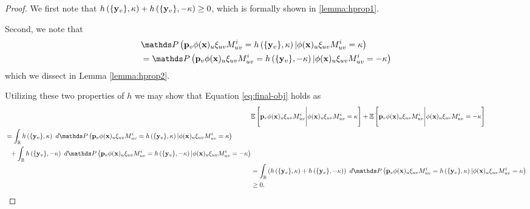 \documentclass{article}
\begin{document}
\begin{lemma}
\begin{proof}
We first note that $h\left( \{\mathbf{y}_v\}, \kappa \right) + h\left( \{\mathbf{y}_v\}, -\kappa \right) \geq 0$, which is formally shown in \ref{lemma:hprop1}.

Second, we note that
\begin{align}
\begin{split}
    &\PR{\p_v \phi(\x)_u   \xi_{uv} M_{uv}^i  = h\round{\{\y_v\}, \kappa} | \phi(\x)_u   \xi_{uv} M_{uv}^i = \kappa } \\ &= \PR{\p_v \phi(\x)_u   \xi_{uv} M_{uv}^i  = h\round{\{\y_v\}, -\kappa} | \phi(\x)_u   \xi_{uv} M_{uv}^i = -\kappa}
    \end{split}
\end{align}
which we dissect in Lemma \ref{lemma:hprop2}.

Utilizing these two properties of $h$ we may show that Equation \ref{eq:final-obj} holds as
\begin{align}
    &\E{\p_v \phi(\x)_u   \xi_{uv} M_{uv}^i \Bigg|  \phi(\x)_u   \xi_{uv} M_{uv}^i = \kappa } + \E{\p_v \phi(\x)_u   \xi_{uv} M_{uv}^i \Bigg|  \phi(\x)_u   \xi_{uv} M_{uv}^i = -\kappa } \\
    \begin{split}
    &= \int_\R h\round{\{\y_v\}, \kappa}  \ d\PR{ \p_v \phi(\x)_u   \xi_{uv} M_{uv}^i = h\round{\{\y_v\}, \kappa} | \phi(\x)_u   \xi_{uv} M_{uv}^i = \kappa } \\
    &\ \ + \int_\R h\round{\{\y_v\}, -\kappa}  \ d\PR{ \p_v \phi(\x)_u   \xi_{uv} M_{uv}^i = h\round{\{\y_v\}, -\kappa} | \phi(\x)_u   \xi_{uv} M_{uv}^i = -\kappa } 
    \end{split}\\
    &= \int_\R  \round{ h\round{\{\y_v\}, \kappa} + h\round{\{\y_v\}, -\kappa} }  \ d\PR{ \p_v \phi(\x)_u   \xi_{uv} M_{uv}^i = h\round{\{\y_v\}, \kappa} | \phi(\x)_u   \xi_{uv} M_{uv}^i = \kappa } \\
    &\geq 0.
\end{align}
\end{proof}
\end{lemma}
\end{document}

